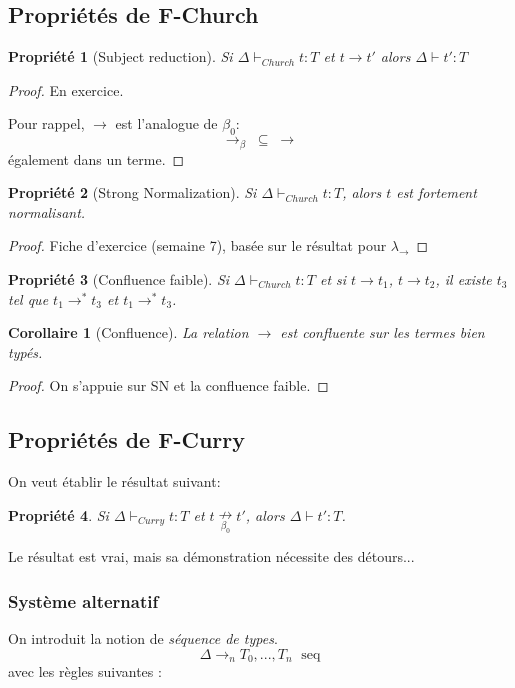 \documentclass{article}
\newtheorem{prop}{Propriété}
\newtheorem{coro}{Corollaire}
\newcommand\seq[0]{\text{ seq}}
\begin{document}
\subsection{Propriétés de F-Church}
\begin{prop}[Subject reduction]
Si $\Delta \vdash_{Church} t:T$ et $t\to t'$ alors $\Delta \vdash t' : T$
\end{prop}

\begin{proof}
En exercice.

Pour rappel, $\to$ est l'analogue de $\beta_0$:\[\to_\beta \; \subseteq \; \to\]
également dans un terme.
\end{proof}

\begin{prop}[Strong Normalization]
Si $\Delta \vdash_{Church} t : T$, alors $t$ est fortement normalisant.
\end{prop}
\begin{proof}
Fiche d'exercice (semaine 7), basée sur le résultat pour $\lambda_\to$
\end{proof}

\begin{prop}[Confluence faible]
Si $\Delta \vdash_{Church} t:T$ et si $t\to t_1$, $t\to t_2$, il existe $t_3$ tel que $t_1\to^*t_3$ et $t_1\to^*t_3$.
\end{prop}

\begin{coro}[Confluence]
La relation $\to$ est confluente sur les termes bien typés.
\end{coro}

\begin{proof}
On s'appuie sur SN et la confluence faible.
\end{proof}


\subsection{Propriétés de F-Curry}
On veut établir le résultat suivant:
\begin{prop}
Si $\Delta \vdash_{Curry}t:T$ et $t\underset{\beta_0}{\nrightarrow} t'$, alors $\Delta \vdash t' : T$.
\end{prop}
Le résultat est vrai, mais sa démonstration nécessite des détours...


\subsubsection{Système alternatif}
On introduit la notion de \emph{séquence de types}.
\[\Delta \to_n T_0,...,T_n \; \seq\]
avec les règles suivantes :
\end{document}
